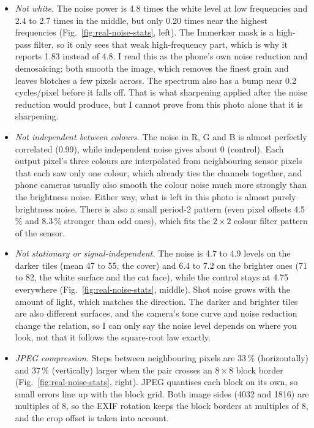 \begin{itemize}
\item \emph{Not white.} The noise power is 4.8 times the white level at low
frequencies and 2.4 to 2.7 times in the middle, but only 0.20 times near the
highest frequencies (Fig.~\ref{fig:real-noise-stats}, left). The Immerkær mask is
a high-pass filter, so it only sees that weak high-frequency part, which is why
it reports 1.83 instead of 4.8. I read this as the phone's own noise reduction
and demosaicing: both smooth the image, which removes the finest grain and leaves
blotches a few pixels across. The spectrum also has a bump near 0.2
cycles/pixel before it falls off. That is what sharpening applied after the
noise reduction would produce, but I cannot prove from this photo alone that it
is sharpening.
\item \emph{Not independent between colours.} The noise in R, G and B is almost
perfectly correlated (0.99), while independent noise gives about 0 (control).
Each output pixel's three colours are interpolated from neighbouring sensor
pixels that each saw only one colour, which already ties the channels together,
and phone cameras usually also smooth the colour noise much more strongly than the
brightness noise. Either way, what is left in this photo is almost purely
brightness noise. There is also a small period-2 pattern (even pixel offsets 4.5\,\% and
8.3\,\% stronger than odd ones), which fits the $2\times2$ colour filter pattern
of the sensor.
\item \emph{Not stationary or signal-independent.} The noise is 4.7 to 4.9
levels on the darker tiles (mean 47 to 55, the cover) and 6.4 to 7.2 on the
brighter ones (71 to 82, the white surface and the cat face), while the control
stays at 4.75 everywhere
(Fig.~\ref{fig:real-noise-stats}, middle). Shot noise grows with the amount of
light, which matches the direction. The darker and brighter tiles are also
different surfaces, and the camera's tone curve and noise reduction change the
relation, so I can only say the noise level depends on where you look, not that
it follows the square-root law exactly.
\item \emph{JPEG compression.} Steps between neighbouring pixels are 33\,\%
(horizontally) and 37\,\% (vertically) larger when the pair crosses an
$8\times8$ block border (Fig.~\ref{fig:real-noise-stats}, right). JPEG quantises
each block on its own, so small errors line up with the block grid. Both image
sides (4032 and 1816) are multiples of 8, so the EXIF rotation keeps the block
borders at multiples of 8, and the crop offset is taken into account.
\end{itemize}

